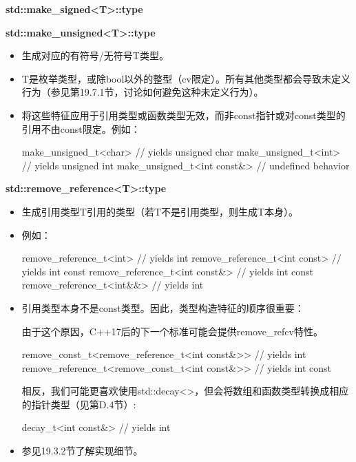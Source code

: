 \textbf{std::make\_signed<T>::type}

\textbf{std::make\_unsigned<T>::type}

\begin{itemize}
\item
生成对应的有符号/无符号T类型。

\item
T是枚举类型，或除bool以外的整型（cv限定）。所有其他类型都会导致未定义行为（参见第19.7.1节，讨论如何避免这种未定义行为）。

\item
将这些特征应用于引用类型或函数类型无效，而非const指针或对const类型的引用不由const限定。例如：
\begin{cpp}
make_unsigned_t<char> // yields unsigned char
make_unsigned_t<int> // yields unsigned int
make_unsigned_t<int const&> // undefined behavior
\end{cpp}
\end{itemize}

\textbf{std::remove\_reference<T>::type}

\begin{itemize}
\item
生成引用类型T引用的类型（若T不是引用类型，则生成T本身）。

\item
例如：
\begin{cpp}
remove_reference_t<int> // yields int
remove_reference_t<int const> // yields int const
remove_reference_t<int const&> // yields int const
remove_reference_t<int&&> // yields int
\end{cpp}

\item
引用类型本身不是const类型。因此，类型构造特征的顺序很重要：

\begin{notice}
由于这个原因，C++17后的下一个标准可能会提供remove\_refcv特性。
\end{notice}

\begin{cpp}
remove_const_t<remove_reference_t<int const&>> // yields int
remove_reference_t<remove_const_t<int const&>> // yields int const
\end{cpp}

相反，我们可能更喜欢使用std::decay<>，但会将数组和函数类型转换成相应的指针类型（见第D.4节）:

\begin{cpp}
decay_t<int const&> // yields int
\end{cpp}

\item
参见19.3.2节了解实现细节。
\end{itemize}

